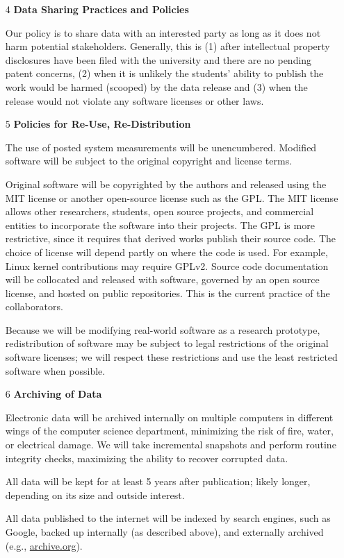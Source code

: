 \begin{enumerate}
\item [4] \textbf{Data Sharing Practices and Policies}

Our policy is to share data with an interested party as long as it does not
harm potential stakeholders.  Generally, this is (1) after intellectual property
disclosures have been filed with the university and there are no pending patent concerns,
(2) when it is unlikely the students' ability to publish the work would be harmed (scooped) by the data release
and (3) when the release would not violate any software licenses or other laws.

\item [5] \textbf{Policies for Re-Use, Re-Distribution}

The use of posted system measurements will be unencumbered.
Modified software will be subject to the original copyright and license terms.

Original software will be copyrighted by the authors and released
using the MIT license or another open-source license such as the
GPL\@.  The MIT license allows other researchers, students, open
source projects, and commercial entities to incorporate the software
into their projects.  The GPL is more restrictive, since it requires
that derived works publish their source code.  The choice of license
will depend partly on where the code is used.  For example, Linux
kernel contributions may require GPLv2. Source code documentation will
be collocated and released with software, governed by an open source
license, and hosted on public repositories. This is the current
practice of the collaborators.

Because we will be modifying real-world software as a research prototype,
redistribution of software may be subject to legal restrictions
of the original software licenses; we will respect these restrictions and
use the least restricted software when possible.


\item [6] \textbf{Archiving of Data}

Electronic data will be archived internally on multiple computers
in different wings of the computer science department,
minimizing the risk of fire, water, or electrical damage.
We will take incremental snapshots and perform routine integrity checks,
maximizing the ability to recover corrupted data.

All data will be kept for at least 5 years after publication; likely longer,
depending on its size and outside interest.

All data published to the internet will be indexed by search engines, such as Google,
backed up internally (as described above),
and externally archived (e.g., \url{archive.org}).

\end{enumerate}

